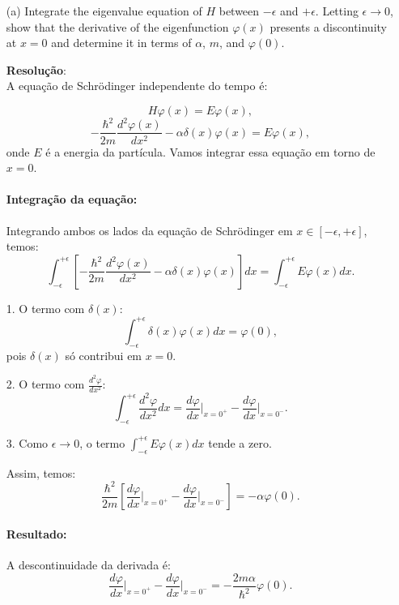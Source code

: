 \documentclass[a4paper,12pt]{article}
\begin{document}
\begin{enumerate}
    \item[(a)] Integrate the eigenvalue equation of \( H \) between \( -\epsilon \) and \( +\epsilon \). 
    Letting \( \epsilon \to 0 \), show that the derivative of the eigenfunction \( \varphi(x) \) 
    presents a discontinuity at \( x = 0 \) and determine it in terms of \( \alpha \), \( m \), and \( \varphi(0) \).

    \textbf{Resolu\c{c}\~ao}:\\
    A equação de Schrödinger independente do tempo é:

    \[
    H \varphi(x) = E \varphi(x),
    \]
\[
-\frac{\hbar^2}{2m} \frac{d^2 \varphi(x)}{dx^2} - \alpha \delta(x) \varphi(x) = E \varphi(x),
\]
onde \( E \) é a energia da partícula. Vamos integrar essa equação em torno de \( x = 0 \).

\paragraph{Integração da equação:}
Integrando ambos os lados da equação de Schrödinger em \( x \in [-\epsilon, +\epsilon] \), temos:
\[
\int_{-\epsilon}^{+\epsilon} \left[ -\frac{\hbar^2}{2m} \frac{d^2 \varphi(x)}{dx^2} - \alpha \delta(x) \varphi(x) \right] dx = \int_{-\epsilon}^{+\epsilon} E \varphi(x) dx.
\]

1. O termo com \( \delta(x) \):
\[
\int_{-\epsilon}^{+\epsilon} \delta(x) \varphi(x) dx = \varphi(0),
\]
pois \( \delta(x) \) só contribui em \( x = 0 \).

2. O termo com \( \frac{d^2 \varphi}{dx^2} \):
\[
\int_{-\epsilon}^{+\epsilon} \frac{d^2 \varphi}{dx^2} dx = \frac{d\varphi}{dx} \bigg|_{x=0^+} - \frac{d\varphi}{dx} \bigg|_{x=0^-}.
\]

3. Como \( \epsilon \to 0 \), o termo \( \int_{-\epsilon}^{+\epsilon} E \varphi(x) dx \) tende a zero.

Assim, temos:
\[
\frac{\hbar^2}{2m} \left[ \frac{d\varphi}{dx} \bigg|_{x=0^+} - \frac{d\varphi}{dx} \bigg|_{x=0^-} \right] = -\alpha \varphi(0).
\]

\paragraph{Resultado:}
A descontinuidade da derivada é:
\[
\frac{d\varphi}{dx} \bigg|_{x=0^+} - \frac{d\varphi}{dx} \bigg|_{x=0^-} = -\frac{2m\alpha}{\hbar^2} \varphi(0).
\]
    

\end{enumerate}
\end{document}
